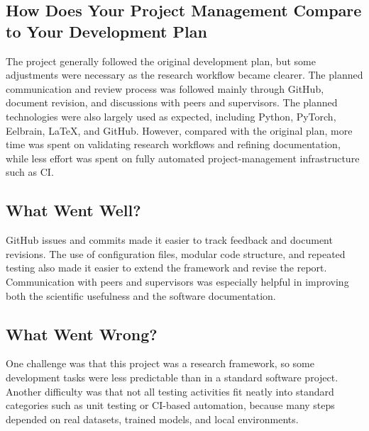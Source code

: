 \documentclass{article}
\begin{document}

\subsection{How Does Your Project Management Compare to Your Development Plan}


The project generally followed the original development plan, but some adjustments were necessary as the research workflow became clearer.
The planned communication and review process was followed mainly through GitHub, document revision, and discussions with peers and supervisors.
The planned technologies were also largely used as expected, including Python, PyTorch, Eelbrain, \LaTeX{}, and GitHub.
However, compared with the original plan, more time was spent on validating research workflows and refining documentation, while less effort was spent on fully automated project-management infrastructure such as CI.








\subsection{What Went Well?}

GitHub issues and commits made it easier to track feedback and document revisions.
The use of configuration files, modular code structure, and repeated testing also made it easier to extend the framework and revise the report.
Communication with peers and supervisors was especially helpful in improving both the scientific usefulness and the software documentation.






\subsection{What Went Wrong?}


One challenge was that this project was a research framework, so some development tasks were less predictable than in a standard software project.
Another difficulty was that not all testing activities fit neatly into standard categories such as unit testing or CI-based automation, because many steps depended on real datasets, trained models, and local environments.
\end{document}
